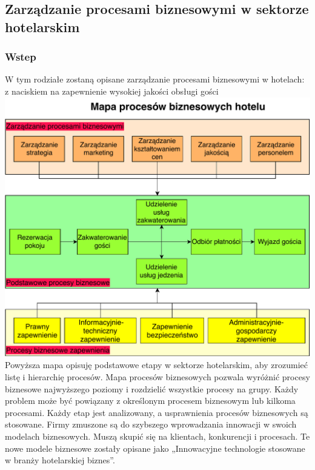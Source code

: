 \documentclass[a4paper, 12pt]{article}
\begin{document}
\subsection{Zarządzanie procesami biznesowymi w sektorze hotelarskim}
\subsubsection{Wstep}
\hspace*{1 cm} W tym rodziałe zostaną opisane zarządzanie procesami biznesowymi w hotelach: z naciskiem na zapewnienie wysokiej jakości obsługi gości\newline
\includegraphics[scale=0.9]{hotel} \newline
Powyższa mapa opisuję podstawowe etapy w sektorze hotelarskim, aby zrozumieć listę i hierarchię procesów. Mapa procesów biznesowych pozwala wyróżnić procesy biznesowe najwyższego poziomy i rozdzielić wszystkie procesy na grupy. Każdy problem może być powiązany z określonym procesem biznesowym lub kilkoma procesami.\newline
Każdy etap jest analizowany, a usprawnienia procesów biznesowych są stosowane.\newline
\hspace*{1cm}Firmy zmuszone są do szybszego wprowadzania innowacji w swoich modelach biznesowych. Muszą skupić się na klientach, konkurencji i procesach. Te nowe modele biznesowe zostały opisane jako „Innowacyjne technologie stosowane w branży hotelarskiej biznes”.
\end{document}
